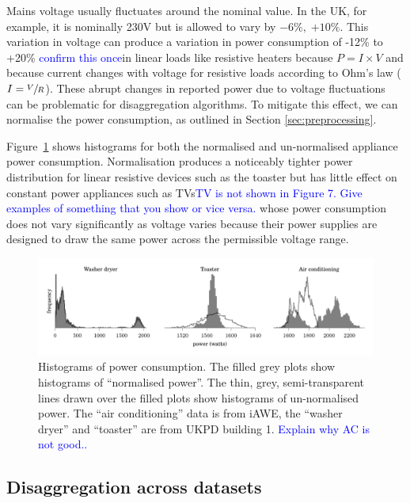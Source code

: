 \documentclass{sig-alternate}
\newcommand{\bluecolor}[1]{\textcolor{blue}{#1}}
\begin{document}
\noindent
Mains voltage usually fluctuates around the nominal value. In the UK, for example, it is nominally 230\;V but is allowed to vary by
$-6\%,\;{+10}\%$.  This variation in voltage can produce a variation in power consumption of -12\% to +20\% \bluecolor{confirm this once}in linear loads like resistive heaters because $P=I \times V$ and because current changes with voltage
for resistive loads according to Ohm's law ($I=\sfrac{V}{R}$).
These abrupt changes in reported power due to voltage fluctuations can be
problematic for disaggregation algorithms.  To mitigate this effect, we can normalise the power consumption, as outlined in Section \ref{sec:preprocessing}.

Figure~\ref{fig:power_histograms} shows
histograms for both the normalised and un-normalised appliance power
consumption. Normalisation produces a noticeably tighter power
distribution for linear resistive devices such as the toaster but has
little effect on constant power appliances such as TVs\bluecolor{TV is not shown in Figure 7. Give examples of something that you show or vice versa.} whose power consumption does
not vary significantly as voltage varies because their power supplies are designed to draw the same power across the permissible voltage range.

\begin{figure}[!t]
  \centering
  \includegraphics{figures/power_histograms.pdf} 
  \caption{Histograms of power consumption. The filled grey plots show
    histograms of ``normalised power''.  The thin, grey,
    semi-transparent lines drawn over the filled plots show histograms
    of un-normalised power.  The ``air conditioning'' data is from
    iAWE, the ``washer dryer'' and ``toaster'' are from UKPD building 1. \bluecolor{Explain why AC is not good..}}
  \label{fig:power_histograms} 
\end{figure}

\subsection{Disaggregation across datasets}
\end{document}
